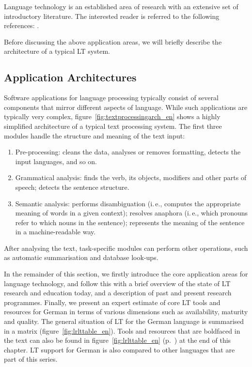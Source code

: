 \documentclass[]{../../metanetpaper}
\begin{document}
\begin{multicols}{2}
Language technology is an established area of research with an extensive set of introductory literature. The interested reader is referred to the following references:  \cite{carstensen-etal1, jurafsky-martin01, manning-schuetze1, lt-world1, lt-survey1}.

Before discussing the above application areas, we will briefly describe the architecture of a typical LT system.

\subsection{Application Architectures}

Software applications for language processing typically consist of several components that mirror different aspects of language. While such applications are typically very complex, figure~\ref{fig:textprocessingarch_en} shows a highly simplified architecture of a typical text processing system. The first three modules handle the structure and meaning of the text input:

\begin{enumerate}
\item Pre-processing: cleans the data, analyses or removes formatting, detects the input languages, and so on.
\item Grammatical analysis: finds the verb, its objects, modifiers and other parts of speech; detects the sentence structure.
\item Semantic analysis: performs disambiguation (i.\,e., computes the appropriate meaning of words in a given context); resolves anaphora (i.\,e., which pronouns refer to which nouns in the sentence); represents the meaning of the sentence in a machine-readable way.
\end{enumerate}

After analysing the text, task-specific modules can perform other operations, such as automatic summarisation and database look-ups.

In the remainder of this section, we firstly introduce the core application areas for language technology, and follow this with a brief overview of the state of LT research and education today, and a description of past and present research programmes. Finally, we present an expert estimate of core LT tools and resources for German in terms of various dimensions such as availability, maturity and quality. The general situation of LT for the German language is summarised in a matrix (figure~\ref{fig:lrlttable_en}). Tools and resources that are boldfaced in the text can also be found in figure~\ref{fig:lrlttable_en} (p.~\pageref{fig:lrlttable_en}) at the end of this chapter. LT support for German is also compared to other languages that are part of this series.


\end{multicols}
\end{document}
